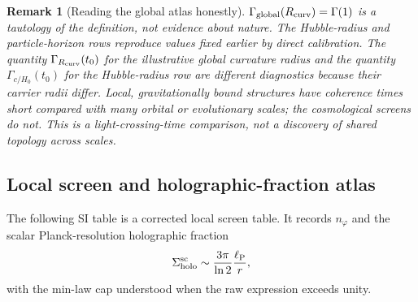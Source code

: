 \documentclass[11pt,a4paper]{article}
\newtheorem{remark}[theorem]{Remark}
\newcommand{\ellP}{\ell_{\rm P}}
\begin{document}
\begin{remark}[Reading the global atlas honestly]
$\Gamma_{\rm global}(R_{\rm curv})=\Gamma(1)$ is a tautology of the definition, not evidence about nature.  The Hubble-radius and particle-horizon rows reproduce values fixed earlier by direct calibration.  The quantity $\Gamma_{R_{\rm curv}}(t_0)$ for the illustrative global curvature radius and the quantity $\Gamma_{c/H_0}(t_0)$ for the Hubble-radius row are different diagnostics because their carrier radii differ.  Local, gravitationally bound structures have coherence times short compared with many orbital or evolutionary scales; the cosmological screens do not.  This is a light-crossing-time comparison, not a discovery of shared topology across scales.
\end{remark}

\subsection*{Local screen and holographic-fraction atlas}

The following SI table is a corrected local screen table.  It records $n_\varphi$ and the scalar Planck-resolution holographic fraction
\[
\Sigma_{\rm holo}^{\rm sc}\sim\frac{3\pi}{\ln2}\frac{\ellP}{r},
\]
with the min-law cap understood when the raw expression exceeds unity.
\end{document}
